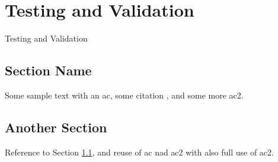 \chapter{Testing and Validation}\label{chap:test_and_val}
Testing and Validation


\section{Section Name} \label{sec:s1}
Some sample text with an \ac{ac}, some citation \cite{citeKey1}, and some more \ac{ac2}.


\section{Another Section}
Reference to Section \ref{sec:s1}, and reuse of \ac{ac} nad \ac{ac2} with also full use of \acf{ac2}.
